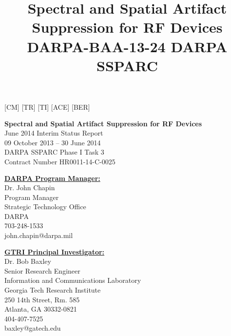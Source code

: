 \newabbrev{}[CM]
\newabbrev{}[TR]
\newabbrev{}[TI]
\newabbrev{}[ACE]
\newabbrev{}[BER]

\usepackage{fancyheadings} %
\pagestyle{fancyplain} %
\title{\Large{\textbf{Spectral and Spatial Artifact Suppression for RF Devices}\\
DARPA-BAA-13-24 DARPA SSPARC}}

\vspace*{6.6923pt}   %
\noindent\textbf{Spectral and Spatial Artifact Suppression for RF Devices}\\
June 2014 Interim Status Report\\
09 October 2013 -- 30 June 2014\\
DARPA SSPARC Phase I Task 3\\
Contract Number HR0011-14-C-0025\\
\vspace{13.3846pt}

\noindent\begin{minipage}[b]{0.45\linewidth}
\textbf{\underline{DARPA Program Manager:}}\\
Dr. John Chapin\\
Program Manager\\
Strategic Technology Office\\
DARPA\\
703-248-1533\\
john.chapin@darpa.mil\\	
\vspace{13.3846pt}   %
\vspace{13.3846pt}
\end{minipage}
\hspace{0.5cm}
\noindent\begin{minipage}[b]{0.45\linewidth}
\textbf{\underline{GTRI Principal Investigator:}}\\
Dr. Bob Baxley\\
Senior Research Engineer\\
Information and Communications Laboratory\\
Georgia Tech Research Institute\\
250 14th Street, Rm. 585\\
Atlanta, GA 30332-0821\\
404-407-7525\\
baxley@gatech.edu\\
\end{minipage}


